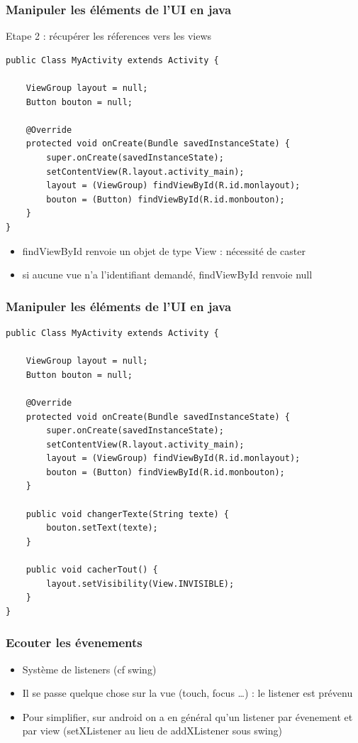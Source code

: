 \documentclass{beamer}
\begin{document}
\begin{frame}[fragile]
\frametitle{Manipuler les éléments de l'UI en java}
Etape 2 : récupérer les réferences vers les views
\begin{lstlisting}
public Class MyActivity extends Activity {

    ViewGroup layout = null;
    Button bouton = null;

    @Override
    protected void onCreate(Bundle savedInstanceState) {
        super.onCreate(savedInstanceState);
        setContentView(R.layout.activity_main);
        layout = (ViewGroup) findViewById(R.id.monlayout);
        bouton = (Button) findViewById(R.id.monbouton);
    }
}
\end{lstlisting}
\begin{itemize}
    \item findViewById renvoie un objet de type View : nécessité de caster
    \item si aucune vue n'a l'identifiant demandé, findViewById renvoie null
 \end{itemize}
\end{frame}
\begin{frame}[fragile]
\frametitle{Manipuler les éléments de l'UI en java}
\begin{lstlisting}
public Class MyActivity extends Activity {

    ViewGroup layout = null;
    Button bouton = null;

    @Override
    protected void onCreate(Bundle savedInstanceState) {
        super.onCreate(savedInstanceState);
        setContentView(R.layout.activity_main);
        layout = (ViewGroup) findViewById(R.id.monlayout);
        bouton = (Button) findViewById(R.id.monbouton);
    }
	
    public void changerTexte(String texte) {
        bouton.setText(texte);
    }
	
    public void cacherTout() {
        layout.setVisibility(View.INVISIBLE);
    }
}
\end{lstlisting}
\end{frame}
\begin{frame}[fragile]
\frametitle{Ecouter les évenements}
\begin{itemize}
 \item Système de listeners (cf swing)
 \item Il se passe quelque chose sur la vue (touch, focus \ldots) : le listener
 est prévenu
 \item Pour simplifier, sur android on a en général qu'un listener par évenement
 et par view (setXListener au lieu de addXListener sous swing)
 \end{itemize}
\end{frame}
\end{document}
